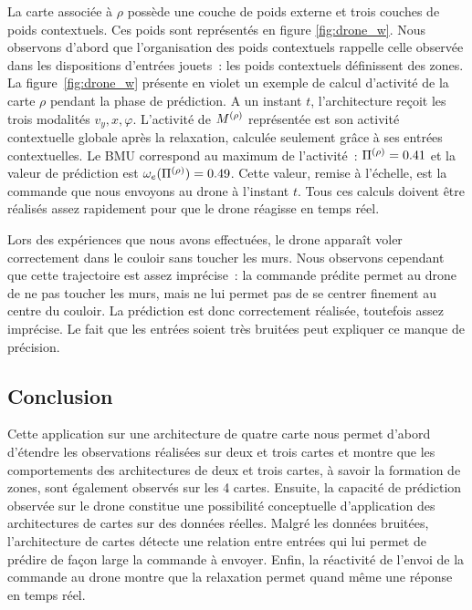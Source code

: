 \documentclass[../main]{subfiles}
\begin{document}
La carte associée à $\rho$ possède une couche de poids externe et trois couches de poids contextuels. 
Ces poids sont représentés en figure \ref{fig:drone_w}. 
Nous observons d'abord que l'organisation des poids contextuels rappelle celle observée dans les dispositions d'entrées jouets~: les poids contextuels définissent des zones. 
La figure~\ref{fig:drone_w} présente en violet un exemple de calcul d'activité de la carte $\rho$ pendant la phase de prédiction.
A un instant $t$, l'architecture reçoit les trois modalités $v_y, x, \varphi$.
L'activité de $M^{({\rho})}$ représentée est son activité contextuelle globale après la relaxation, calculée seulement grâce à ses entrées contextuelles.
Le BMU correspond au maximum de l'activité~: $\Pi^{({\rho})} = 0.41$ et la valeur de prédiction est $\omega_e(\Pi^{({\rho})}) = 0.49$. Cette valeur, remise à l'échelle, est la commande que nous envoyons au drone à l'instant $t$.
Tous ces calculs doivent être réalisés assez rapidement pour que le drone réagisse en temps réel.

Lors des expériences que nous avons effectuées, le drone apparaît voler correctement dans le couloir sans toucher les murs. Nous observons cependant que cette trajectoire est assez imprécise~: la commande prédite permet au drone de ne pas toucher les murs, mais ne lui permet pas de se centrer finement au centre du couloir.
La prédiction est donc correctement réalisée, toutefois assez imprécise. 
Le fait que les entrées soient très bruitées peut expliquer ce manque de précision. 

\subsection{Conclusion}

Cette application sur une architecture de quatre carte nous permet d'abord d'étendre les observations réalisées sur deux et trois cartes et montre que les comportements des architectures de deux et trois cartes, à savoir la formation de zones, sont également observés sur les 4 cartes.
Ensuite, la capacité de prédiction observée sur le drone constitue une possibilité conceptuelle d'application des architectures de cartes sur des données réelles. 
Malgré les données bruitées, l'architecture de cartes détecte une relation entre entrées qui lui permet de prédire de façon large la commande à envoyer.
Enfin, la réactivité de l'envoi de la commande au drone montre que la relaxation permet quand même une réponse en temps réel.
\end{document}

